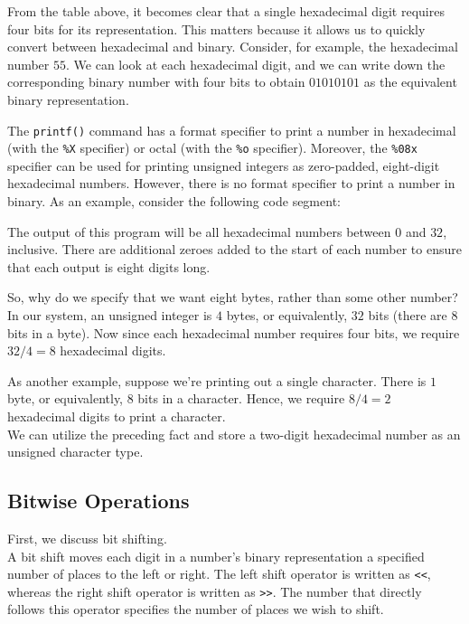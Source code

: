 From the table above, it becomes clear that a single hexadecimal digit requires four bits for its representation. This matters because it allows us to quickly convert between hexadecimal and binary. Consider, for example, the hexadecimal number $55$. We can look at each hexadecimal digit, and we can write down the corresponding binary number with four bits to obtain $01010101$ as the equivalent binary representation. 


The \verb!printf()! command has a format specifier to print a number in hexadecimal (with the \verb!%X! specifier) or octal (with the \verb!%o! specifier). Moreover, the \verb!%08x! specifier can be used for printing unsigned integers as zero-padded, eight-digit hexadecimal numbers. However, there is no format specifier to print a number in binary. As an example, consider the following code segment: \newpage


\lstset{
caption=Hexadecimal Format Specifier}
\begin{center}
\label{Hexadecimal Format Specifier}
\end{center}

The output of this program will be all hexadecimal numbers between $0$ and $32$, inclusive. There are additional zeroes added to the start of each number to ensure that each output is eight digits long. 



So, why do we specify that we want eight bytes, rather than some other number? In our system, an unsigned integer is $4$ bytes, or equivalently, $32$ bits (there are $8$ bits in a byte). Now since each hexadecimal number requires four bits, we require $32/4 = 8$ hexadecimal digits. 

As another example, suppose we're printing out a single character. There is $1$ byte, or equivalently, $8$ bits in a character. Hence, we require $8/4 = 2$ hexadecimal digits to print a character. \\

We can utilize the preceding fact and store a two-digit hexadecimal number as an unsigned character type. 


\subsection{Bitwise Operations}
First, we discuss bit shifting. \\


A bit shift moves each digit in a number's binary representation a specified number of places to the left or right. The left shift operator is written as \verb!<<!, whereas the right shift operator is written as \verb!>>!. The number that directly follows this operator specifies the number of places we wish to shift. 



